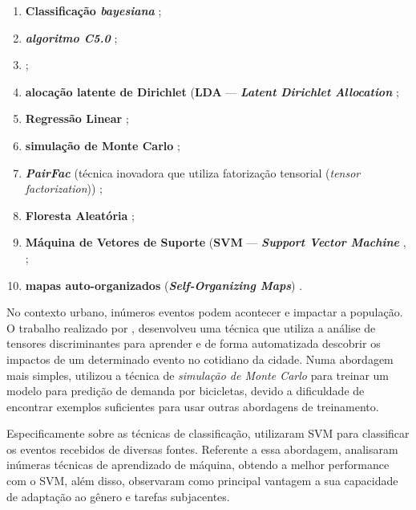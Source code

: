 \documentclass[
	12pt,				%
	oneside,			%
	a4paper,			%
	english,			%
	brazil				%
	]{abntex2ppgsi}
\begin{document}
{{\begin{enumerate}
\item \textbf{Classificação \textit{bayesiana}} \cite{Mata2015};
\item \textit{\textbf{algoritmo C5.0}} \cite{Zagal2016};
\item {} \cite{Anantharam2015};
\item {} \textbf{alocação latente de Dirichlet}  {(\textbf{LDA} --- \textbf{\textit{Latent Dirichlet Allocation}}} \cite{Farseev2015, Abbasi2015, Hasan2014, DiLorenzo2013, Ni2016};
\item \textbf{Regressão Linear} \cite{Gutev2016, Bendler2014, Ni2016, Guo2016};
\item \textbf{simulação de Monte Carlo} \cite{Chen2016};
\item \textbf{\textit{PairFac}} (técnica inovadora que utiliza fatorização tensorial (\textit{tensor factorization})) \cite{Wen2016};
\item \textbf{Floresta Aleatória} \cite{Farseev2015};
\item {} {\textbf{Máquina de Vetores de Suporte} (\textbf{SVM} --- \textit{\textbf{Support Vector Machine}}} \cite{Mukherjee2015}, \cite{Gal-Tzur2014};
\item \textbf{mapas auto-organizados} (\textit{\textbf{Self-Organizing Maps}}) \cite{Frias-Martinez2014}.
\end{enumerate}

No contexto urbano, inúmeros eventos podem acontecer e impactar a população. O trabalho realizado por \cite{Wen2016}, desenvolveu uma técnica que utiliza a análise de tensores discriminantes para aprender e de forma automatizada descobrir os impactos de um determinado evento no cotidiano da cidade. Numa abordagem mais simples, \cite{Chen2016} utilizou a técnica de \textit{simulação de Monte Carlo} para treinar um modelo para predição de demanda por bicicletas, devido a dificuldade de encontrar exemplos suficientes para usar outras abordagens de treinamento. 

Especificamente sobre as técnicas de classificação, \cite{Mukherjee2015} utilizaram SVM para classificar os eventos recebidos de diversas fontes. Referente a essa abordagem, \cite{Gal-Tzur2014} analisaram inúmeras técnicas de aprendizado de máquina, obtendo a melhor performance com o SVM, além disso, observaram como principal vantagem a sua capacidade de adaptação ao gênero e tarefas subjacentes. 

}}
\end{document}

